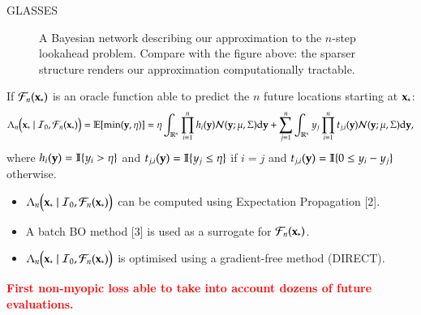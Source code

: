 \documentclass[15pt,serif,mathserif,final]{beamer}
\newcommand{\I}{\mathcal{I}}
\newcommand{\ud}{\mathrm{d}}
\newcommand{\E}{\mathbb{E}}
\newcommand{\N}{\mathcal{N}}
\newcommand{\future}{\mathcal{F}}
\newcommand{\IR}{\mathbb{R}}
\begin{document}
\begin{frame}{}
\begin{columns}[t]
\begin{column}{0.32\linewidth}
\begin{block}{GLASSES}
\begin{figure}[t!]
\caption{
    A Bayesian network describing our approximation to the $n$-step lookahead problem.  Compare with the figure above: the sparser structure renders our approximation computationally tractable. }
\label{fig:bayes_net_glasses}
\end{figure}

If $\future_{n}(\latentVector_*)$ is an oracle function able to predict the $n$ future  locations starting at $\mathbf{x}_*$:
\begin{equation}\nonumber
\Lambda_n \bigl(\latentVector_* \mid \I_0, \future_{n}(\latentVector_*) \bigr)  =\E [\min (\dataVector,\eta)]  =  \eta\int_{\IR^n} \prod_{i=1}^nh_i(\dataVector) \N(\dataVector; \mu, \Sigma) \ud \dataVector + \sum_{j=1}^n  \int_{\IR^n} \dataScalar_j \prod_{i=1}^n t_{j,i}(\dataVector) \N(\dataVector; \mu, \Sigma) \ud \dataVector,
\end{equation}
 where  $h_i(\mathbf{y}) = \mathbb{I}\{y_i>\eta\}$ and $t_{j,i}(\mathbf{y}) = \mathbb{I}\{y_j \leq\eta\}$ if $i=j$ and 
$t_{j,i}(\mathbf{y}) =\mathbb{I}\{ 0 \leq y_i-y_j \}$ otherwise.

 \begin{itemize}
 \item $\Lambda_n \bigl(\latentVector_* \mid \I_0, \future_{n}(\latentVector_*) \bigr)$ can be computed using Expectation Propagation [2].
 \item A batch BO method [3] is used as a surrogate for $\future_{n}(\latentVector_*)$. 
 \item $\Lambda_n \bigl(\latentVector_* \mid \I_0, \future_{n}(\latentVector_*) \bigr)$ is optimised using a  gradient-free method (DIRECT).
 \end{itemize}
 
 \begin{center}
 \textcolor{red}{\textbf{First non-myopic loss able to take into account dozens of future evaluations.}}
 \end{center}
 

\end{block}
\end{column}
\end{columns}
\end{frame}
\end{document}
